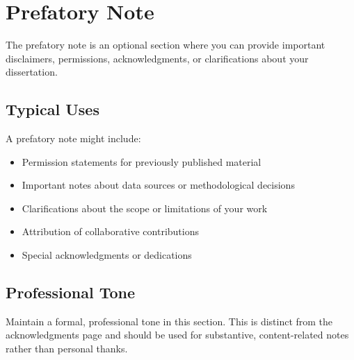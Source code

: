 \chapter*{Prefatory Note}

The prefatory note is an optional section where you can provide important disclaimers, permissions, acknowledgments, or clarifications about your dissertation.

\section*{Typical Uses}

A prefatory note might include:
\begin{itemize}
\item Permission statements for previously published material
\item Important notes about data sources or methodological decisions
\item Clarifications about the scope or limitations of your work
\item Attribution of collaborative contributions
\item Special acknowledgments or dedications
\end{itemize}

\section*{Professional Tone}

Maintain a formal, professional tone in this section. This is distinct from the acknowledgments page and should be used for substantive, content-related notes rather than personal thanks.

\newpage